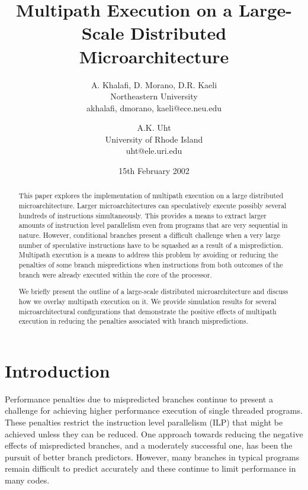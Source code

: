 \documentclass[10pt,dvips]{article}
\begin{document}
\parskip 2mm
%
%
\title{Multipath Execution on a Large-Scale Distributed 
Microarchitecture}
%
\author{
A. Khalafi, D. Morano, D.R. Kaeli\\
Northeastern University\\
{akhalafi, dmorano, kaeli}@ece.neu.edu\\
\and
A.K. Uht \\
University of Rhode Island\\ uht@ele.uri.edu
}
%
\date{15th February 2002}
%
%
\maketitle
%
\begin{abstract}
This paper explores the implementation of multipath execution on a
large distributed microarchitecture.  Larger microarchitectures can
speculatively execute possibly several hundreds of instructions
simultaneously.  This provides a means to extract larger amounts of
instruction level parallelism even from programs that are very
sequential in nature.  However, conditional branches present a
difficult challenge when a very large number of speculative
instructions have to be squashed as a result of a misprediction.
Multipath execution is a means to address this problem
by avoiding or reducing the penalties of some branch mispredictions when
instructions from both outcomes of the branch were
already executed within the core of the processor.

We briefly present the outline of a large-scale distributed
microarchitecture and discuss how we overlay multipath execution on
it.  We provide simulation results for several microarchitectural
configurations that demonstrate the positive effects of multipath
execution in reducing the penalties associated with branch
mispredictions.
\end{abstract}
%
\section{Introduction}
%
Performance penalties due to mispredicted branches continue to
present a challenge for achieving higher performance execution
of single threaded programs.
These penalties restrict the instruction level parallelism (ILP)
that might be achieved unless they can be reduced.
One approach towards reducing the negative effects of mispredicted
branches, and a moderately successful one, has been the pursuit
of better branch predictors.  However, many branches in typical
programs remain difficult to predict accurately and these continue
to limit performance in many codes.
\end{document}
